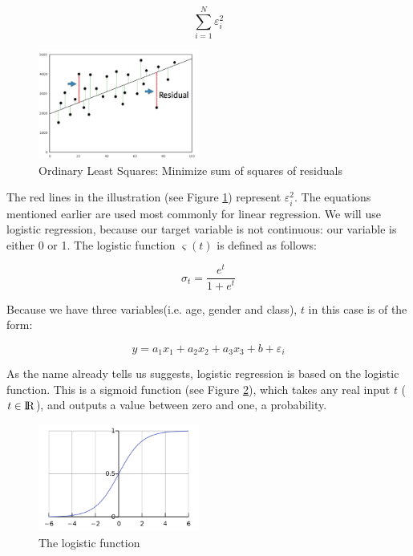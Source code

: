 \documentclass[11pt]{article}
\begin{document}
\begin{equation}
\label{eq:residual}
\sum_{i=1}^{N}\varepsilon^2_{i}
\end{equation}



\begin{figure}[htbp]
\centering
\includegraphics[width=200px]{./Residual.png}
\caption{\label{tab:ols}
Ordinary Least Squares: Minimize sum of squares of residuals}
\end{figure}

The red lines in the illustration (see Figure \ref{tab:ols}) represent \(\varepsilon^2_{i}\). 
The equations mentioned earlier are used most commonly for linear regression. We will use logistic regression, because our target variable is not continuous: our variable is either 0 or 1. The logistic function \(\varsigma(t)\) is defined as follows:

\begin{equation}
\label{eq:2}
\sigma_t = \frac{e^t}{1+e^t}
\end{equation}

Because we have three variables(i.e. age, gender and class), \(t\) in this case is of the form:

\begin{equation}
y=a_1x_1+a_2x_2+a_3x_3+b+\varepsilon_{i} 
\end{equation}

As the name already tells us suggests, logistic regression is based on the logistic function. This is a sigmoid function (see Figure \ref{tab:log}), which takes any real input \(t\) (\(t\in{\rm I\!R}\)), and outputs a value between zero and one, a probability.

\begin{figure}[htbp]
\centering
\includegraphics[width=200px]{./LogisticCurve.png}
\caption{\label{tab:log}
The logistic function}
\end{figure}
\end{document}
